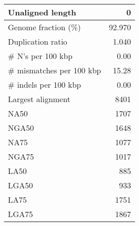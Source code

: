 \documentclass[12pt,a4paper]{article}
\begin{document}
\begin{table}[ht]
\begin{center}
\begin{tabular}{|l*{1}{|r}|}
Unaligned length & 0 \\ \hline
Genome fraction (\%) & 92.970 \\ \hline
Duplication ratio & 1.040 \\ \hline
\# N's per 100 kbp & 0.00 \\ \hline
\# mismatches per 100 kbp & 15.28 \\ \hline
\# indels per 100 kbp & 0.00 \\ \hline
Largest alignment & 8401 \\ \hline
NA50 & 1707 \\ \hline
NGA50 & 1648 \\ \hline
NA75 & 1077 \\ \hline
NGA75 & 1017 \\ \hline
LA50 & 885 \\ \hline
LGA50 & 933 \\ \hline
LA75 & 1751 \\ \hline
LGA75 & 1867 \\ \hline
\end{tabular}
\end{center}
\end{table}
\end{document}
